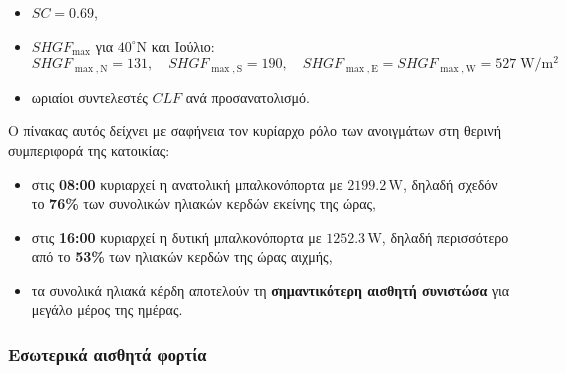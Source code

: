 \documentclass[12pt,a4paper]{article}
\begin{document}
\begin{itemize}
\item \(SC = 0.69\),
\item \(SHGF_{\max}\) για \(40^\circ\mathrm{N}\) και Ιούλιο:
\[
SHGF_{\max,\mathrm{N}} = 131,\quad
SHGF_{\max,\mathrm{S}} = 190,\quad
SHGF_{\max,\mathrm{E}} = SHGF_{\max,\mathrm{W}} = 527\;\mathrm{W/m^2}
\]
\item ωριαίοι συντελεστές \(CLF\) ανά προσανατολισμό.
\end{itemize}

\begin{table}[H]
\centering
\caption{Ηλιακά κέρδη από διαφανή στοιχεία}
\end{table}

Ο πίνακας αυτός δείχνει με σαφήνεια τον κυρίαρχο ρόλο των ανοιγμάτων στη θερινή
συμπεριφορά της κατοικίας:

\begin{itemize}
\item στις \textbf{08:00} κυριαρχεί η ανατολική μπαλκονόπορτα με
\(2199.2\,\mathrm{W}\), δηλαδή σχεδόν το \textbf{76\%} των συνολικών ηλιακών κερδών εκείνης της ώρας,
\item στις \textbf{16:00} κυριαρχεί η δυτική μπαλκονόπορτα με
\(1252.3\,\mathrm{W}\), δηλαδή περισσότερο από το \textbf{53\%} των ηλιακών κερδών της ώρας αιχμής,
\item τα συνολικά ηλιακά κέρδη αποτελούν τη \textbf{σημαντικότερη αισθητή συνιστώσα}
για μεγάλο μέρος της ημέρας.
\end{itemize}

\subsubsection{Εσωτερικά αισθητά φορτία}
\end{document}
